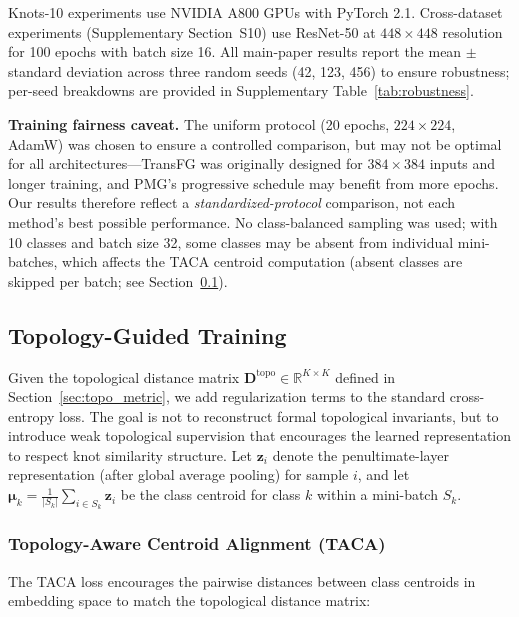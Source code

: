 \documentclass[preprint,review,12pt]{elsarticle}
\begin{document}
Knots-10 experiments use NVIDIA A800 GPUs with PyTorch 2.1. Cross-dataset experiments (Supplementary Section~S10) use ResNet-50 at $448 \times 448$ resolution for 100 epochs with batch size 16. All main-paper results report the mean $\pm$ standard deviation across three random seeds (42, 123, 456) to ensure robustness; per-seed breakdowns are provided in Supplementary Table~\ref{tab:robustness}.

\textbf{Training fairness caveat.} The uniform protocol (20 epochs, $224 \times 224$, AdamW) was chosen to ensure a controlled comparison, but may not be optimal for all architectures---TransFG was originally designed for $384 \times 384$ inputs and longer training, and PMG's progressive schedule may benefit from more epochs. Our results therefore reflect a \emph{standardized-protocol} comparison, not each method's best possible performance. No class-balanced sampling was used; with 10 classes and batch size 32, some classes may be absent from individual mini-batches, which affects the TACA centroid computation (absent classes are skipped per batch; see Section~\ref{sec:topo_method}).


\subsection{Topology-Guided Training}
\label{sec:topo_method}

Given the topological distance matrix $\mathbf{D}^{\text{topo}} \in \mathbb{R}^{K \times K}$ defined in Section~\ref{sec:topo_metric}, we add regularization terms to the standard cross-entropy loss. The goal is not to reconstruct formal topological invariants, but to introduce weak topological supervision that encourages the learned representation to respect knot similarity structure. Let $\mathbf{z}_i$ denote the penultimate-layer representation (after global average pooling) for sample $i$, and let $\boldsymbol{\mu}_k = \frac{1}{|S_k|}\sum_{i \in S_k} \mathbf{z}_i$ be the class centroid for class $k$ within a mini-batch $S_k$.

\subsubsection{Topology-Aware Centroid Alignment (TACA)}

The TACA loss encourages the pairwise distances between class centroids in embedding space to match the topological distance matrix:
\end{document}

